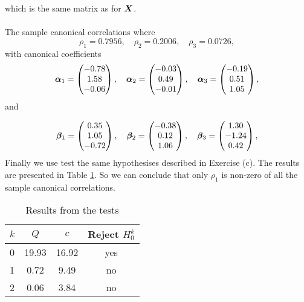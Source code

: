which is the same matrix as for $\bm{X}$.\\
\\
The sample canonical correlations where 
\begin{equation*}
  \rho_{1} = 0.7956,\quad  \rho_{2} =   0.2006,\quad \rho_{3} =  0.0726,
\end{equation*}
with canonical coefficients
\begin{equation*}
  \bm{\alpha}_{1} =
  \begin{pmatrix}
    -0.78 \\ 
    1.58 \\ 
    -0.06 
  \end{pmatrix}, \quad
  \bm{\alpha}_{2} =
  \begin{pmatrix}
    -0.03 \\ 
    0.49 \\ 
    -0.01
  \end{pmatrix}, \quad
  \bm{\alpha}_{3} =
  \begin{pmatrix}
    -0.19 \\ 
    0.51 \\ 
    1.05  
  \end{pmatrix},
\end{equation*}
and

\begin{equation*}
  \bm{\beta}_{1} =
  \begin{pmatrix}
    0.35 \\ 
    1.05 \\ 
    -0.72  
  \end{pmatrix}, \quad
  \bm{\beta}_{2} =
  \begin{pmatrix}
    -0.38 \\ 
    0.12 \\ 
    1.06  
  \end{pmatrix}, \quad
  \bm{\beta}_{3} =
  \begin{pmatrix}
    1.30 \\ 
    -1.24 \\ 
    0.42  
  \end{pmatrix},
\end{equation*}
Finally we use test the same hypothesises described in Exercise
(c). The results are presented in Table
\ref{tab:test_ex11_standardized}. So we can conclude that only
$\rho_{1}$ is non-zero of all the sample canonical correlations. 
\begin{table}
  \centering
  \begin{tabular}{l|ccc}
    $k$&$Q$&$c$& Reject $H_{0}^{k}$ \\ \hline
    0 &19.93 &16.92 & yes \\ 
    1 &0.72 &9.49 & no \\ 
    2 &0.06 &3.84 & no  
  \end{tabular}
  \caption{Results from the tests}
  \label{tab:test_ex11_standardized}
\end{table} 
